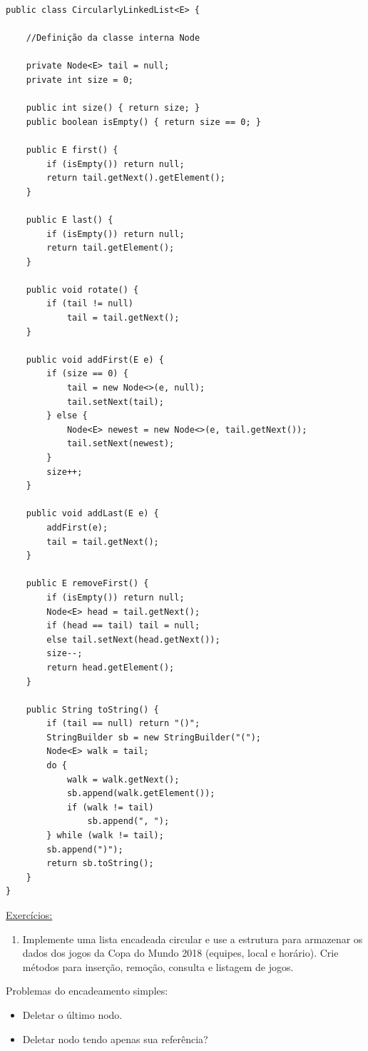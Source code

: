 \begin{verbatim}
public class CircularlyLinkedList<E> {
	
	//Definição da classe interna Node
	
	private Node<E> tail = null;
	private int size = 0;
	
	public int size() { return size; }
	public boolean isEmpty() { return size == 0; }
	
	public E first() {
		if (isEmpty()) return null;
		return tail.getNext().getElement();
	}
	
	public E last() {
		if (isEmpty()) return null;
		return tail.getElement();
	}
	
	public void rotate() {
		if (tail != null)
			tail = tail.getNext();
	}
	
	public void addFirst(E e) {
		if (size == 0) {
			tail = new Node<>(e, null);
			tail.setNext(tail);
		} else {
			Node<E> newest = new Node<>(e, tail.getNext());
			tail.setNext(newest);
		}
		size++;
	}

	public void addLast(E e) {
		addFirst(e);
		tail = tail.getNext();
	}

	public E removeFirst() {
		if (isEmpty()) return null;
		Node<E> head = tail.getNext();
		if (head == tail) tail = null;
		else tail.setNext(head.getNext());
		size--;
		return head.getElement();
	}

	public String toString() {
		if (tail == null) return "()";
		StringBuilder sb = new StringBuilder("(");
		Node<E> walk = tail;
		do {
			walk = walk.getNext();
			sb.append(walk.getElement());
			if (walk != tail)
				sb.append(", ");
		} while (walk != tail);
		sb.append(")");
		return sb.toString();
	}
}
\end{verbatim}

\medskip

\underline{Exercícios:}
\begin{enumerate}
	\item Implemente uma lista encadeada circular e use a estrutura para armazenar os dados dos jogos da Copa do Mundo 2018 (equipes, local e horário). Crie métodos para inserção, remoção, consulta e listagem de jogos.
\end{enumerate}

\clearpage


Problemas do encadeamento simples:
\begin{itemize}
	\item Deletar o último nodo. 
	\item Deletar nodo tendo apenas sua referência?
\end{itemize}


